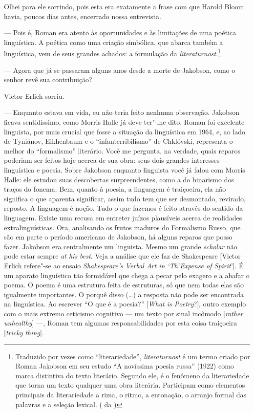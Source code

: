 Olhei para ele sorrindo, pois esta era exatamente a frase com que Harold
Bloom havia, poucos dias antes, encerrado nossa entrevista.

--- Pois é, Roman era atento às oportunidades e às limitações de uma
poética linguística. A poética como uma criação simbólica, que abarca
também a linguística, vem de seus grandes achados: a formulação da
\emph{literaturnost}.\footnote{Traduzido por vezes como 
``literariedade'', \emph{literaturnost} é um termo criado por Roman 
Jakobson em seu estudo ``A novíssima poesia russa'' 
(1922) como marca distintiva do texto literário. Segundo ele, é o
 fenômeno da literariedade que torna um texto qualquer uma obra
 literária. Participam como elementos principais da literariedade 
a rima, o ritmo, a entonação, o arranjo formal das palavras e a
 seleção lexical. ( da )}

--- Agora que já se passaram alguns anos desde a morte de Jakobson, como o
senhor revê sua contribuição?

Victor Erlich sorriu.

--- Enquanto estava em vida, eu não teria feito nenhuma observação.
Jakobson ficava sentidíssimo, como Morris Halle já deve ter"-lhe dito.
Roman foi excelente linguista, por mais crucial que fosse a situação da
linguística em 1964, e, ao lado de Tyniánov, Eikhenbaum e o
``infanterribilismo'' de Chklóvski, representa o melhor do
``formalismo'' literário. Você me pergunta, na verdade, quais reparos poderiam ser feitos
hoje acerca de sua obra: seus dois grandes interesses --- linguística e
poesia. Sobre Jakobson enquanto linguista você já falou com Morris Halle: ele
estudou suas descobertas surpreendentes, como a do binarismo dos traços do fonema.
Bem, quanto à poesia, a linguagem é traiçoeira, ela não significa o que
aparenta significar, assim tudo tem que ser desmontado, revirado,
reposto. A linguagem é noção. Tudo o que fazemos é feito através do sentido da
linguagem. Existe uma recusa em entreter juízos plausíveis acerca de
realidades extralinguísticas. Ora, analisando os frutos maduros do Formalismo Russo, que são em parte
o período americano de Jakobson, há alguns reparos que posso fazer.
 Jakobson era centralmente um linguista. Mesmo um grande \emph{scholar} não pode
estar sempre \emph{at his best}.
Veja a análise que ele faz de Shakespeare [Victor Erlich
 refere"-se ao ensaio \emph{Shakespeare's Verbal Art in `Th'Expense of
 Spirit}']. É um aparato linguístico tão formidável que chega a
pecar pelo exagero e a abafar o poema. O poema é uma estrutura feita de
estruturas, só que nem todas elas são igualmente importantes. O porquê
disso (\ldots{}) a resposta não pode ser encontrada na linguística.
 Ao escrever ``O que é a poesia?'' [\emph{What is
 Poetry}?], outro exemplo com o mais extremo
ceticismo cognitivo --- um texto por sinal incômodo [\emph{rather
unhealthy}] ---, Roman tem algumas responsabilidades por esta coisa
traiçoeira [\emph{tricky thing}].

